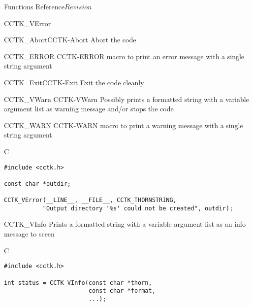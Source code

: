 \begin{cactuspart}{ Functions Reference}{}{$Revision$}
\begin{FunctionDescription}{CCTK\_VError}
\begin{SeeAlsoSection}
\begin{SeeAlso2}{CCTK\_Abort}{CCTK-Abort}
Abort the code
\end{SeeAlso2}
\begin{SeeAlso2} {CCTK\_ERROR} {CCTK-ERROR}
macro to print an error message with a single string argument
\end{SeeAlso2}
\begin{SeeAlso2}{CCTK\_Exit}{CCTK-Exit}
Exit the code cleanly
\end{SeeAlso2}
\begin{SeeAlso2} {CCTK\_VWarn} {CCTK-VWarn}
Possibly prints a formatted string with a variable argument list as
warning message and/or stops the code
\end{SeeAlso2}
\begin{SeeAlso2} {CCTK\_WARN} {CCTK-WARN}
macro to print a warning message with a single string argument
\end{SeeAlso2}
\end{SeeAlsoSection}

\begin{ExampleSection}
\begin{Example}{C}
\begin{verbatim}
#include <cctk.h>

const char *outdir;

CCTK_VError(__LINE__, __FILE__, CCTK_THORNSTRING,
           "Output directory '%s' could not be created", outdir);
\end{verbatim}
\end{Example}
\end{ExampleSection}
\end{FunctionDescription}


\begin{FunctionDescription}{CCTK\_VInfo}
\label{CCTK-VInfo}
Prints a formatted string with a variable argument list as an info message
to sceen

\begin{SynopsisSection}
\begin{Synopsis}{C}
\begin{verbatim}
#include <cctk.h>

int status = CCTK_VInfo(const char *thorn,
                        const char *format,
                        ...);
\end{verbatim}
\end{Synopsis}
\end{SynopsisSection}


\end{FunctionDescription}
\end{cactuspart}
